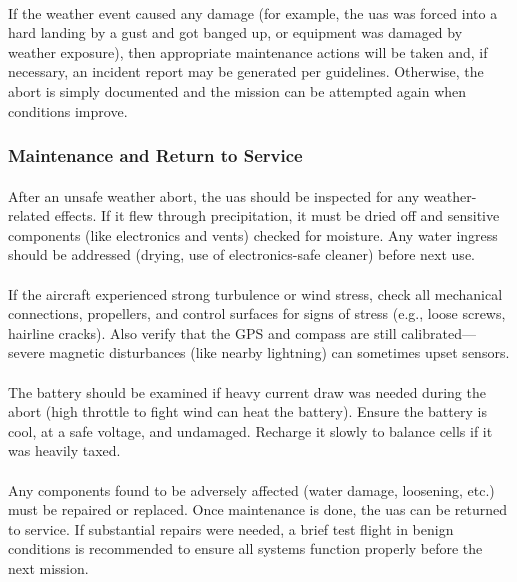                 \paragraph{} If the weather event caused any damage (for example, the \ac{uas} was forced into a hard landing by a gust and got banged up, or equipment was damaged by weather exposure), then appropriate maintenance actions will be taken and, if necessary, an incident report may be generated per \projectmars{} guidelines. Otherwise, the abort is simply documented and the mission can be attempted again when conditions improve.
            
            \subsubsection{Maintenance and Return to Service}
                \paragraph{} After an unsafe weather abort, the \ac{uas} should be inspected for any weather-related effects. If it flew through precipitation, it must be dried off and sensitive components (like electronics and vents) checked for moisture. Any water ingress should be addressed (drying, use of electronics-safe cleaner) before next use.
                \paragraph{} If the aircraft experienced strong turbulence or wind stress, check all mechanical connections, propellers, and control surfaces for signs of stress (e.g., loose screws, hairline cracks). Also verify that the GPS and compass are still calibrated—severe magnetic disturbances (like nearby lightning) can sometimes upset sensors.
                \paragraph{} The battery should be examined if heavy current draw was needed during the abort (high throttle to fight wind can heat the battery). Ensure the battery is cool, at a safe voltage, and undamaged. Recharge it slowly to balance cells if it was heavily taxed.
                \paragraph{} Any components found to be adversely affected (water damage, loosening, etc.) must be repaired or replaced. Once maintenance is done, the \ac{uas} can be returned to service. If substantial repairs were needed, a brief test flight in benign conditions is recommended to ensure all systems function properly before the next mission.
        
